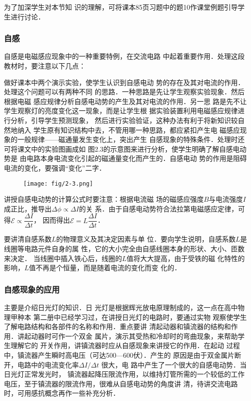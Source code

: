 为了加深学生对本节知
识的理解，可将课本85页习题中的题10作课堂例题引导学
生进行讨论．

\subsubsection{自感}
自感是电磁感应现象中的一种重要特例，在交流电路
中起着重要作用．处理这段教材时，要注意以下几点：

做好课本中两个演示实验，使学生认识到自感电动
势的存在及其对电流的作用．处理这个问题可以有两种不同
的思路．一种思路是先让学生观察实验现象．然后根据电磁
感应规律分析自感电动势的产生及其对电流的作用．另一思
路是先不让学生观察灯的亮度变化这一现象，而是让学生根
据实验装置利用电磁感应规律进行分析，引导学生预测现象，
然后进行实验验证，这种办法有利于将新知识较自然地纳入
学生原有知识结构中去，不管用哪一种思路，都应紧扣产生电
磁感应现象的一般规律——磁通量发生变化上，突出产生
自感现象的特殊条件．处理时还可将课文中的实验图画成如
图2.3的示意图来进行分析，使学生明确了解自感电动势是
由电路本身电流变化引起的磁通量变化而产生的．自感电动
势的作用是阻碍电流的变化，要强调“变化”二字．

\begin{figure}[htp]
    \centering
\texttt{[image: fig/2-3.png]}
    \caption{}
\end{figure}

讲授自感电动势的计算公式时要注意：根据电流磁
场的磁感应强度$B$与电流强度$I$成正比，推导出$\Delta\phi\propto \Delta I$的关
系．由于自感电动势符合法拉第电磁感应定律，可得$\mathcal{E}\propto \dfrac{\Delta I}{\Delta t}$，
因而得出$\mathcal{E}=L\dfrac{\Delta I}{\Delta t}$．

要讲清自感系数$L$的物理意义及其决定因素与单
位．要向学生说明，自感系数$L$是线圈等电路元件自身的属
性，它的大小完全由自感线圈本身的形状、大小、匝数来决定．
当线圈中插入铁心后，线圈的$L$值将大大提高，由于受铁的磁
化特性的影响，$L$值不再是个恒量，而是随着电流的变化而变
化的．

\subsubsection{自感现象的应用}

主要是介绍日光灯的知识．日
光灯是根据辉光放电原理制成的，这一点在高中物理甲种本
第二册中已经学习过，在讲授日光灯的电路时，要通过实物
观察使学生了解电路结构和各部件的名称和作用．重点要讲
清起动器和镇流器的结构和作用．讲起动器时可作一个双金
属片，演示其受热和冷却时的弯曲现象，来帮助学生理解它的
开关作用，讲镇流器时应从自感现象来讲授它的作用．在起动
过程中，镇流器产生瞬时高电压（可达500—600伏）．产生的
原因是由于双金属片断开，电路中的电流变化率$\Delta I/\Delta t$
很大，电
路中产生了一个很大的自感电动势．当日光灯正常发光时，
镇流器起降压限流作用，以维持灯管所需的一个较低的工作
电压，至于镇流器的限流作用，很难从自感电动势的角度讲
清，待讲交流电路时，可用感抗概念再作一些补充分析．

